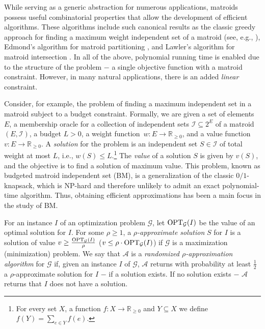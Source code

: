 \documentclass[11pt,letter]{article}
\newcommand{\cA}{{\mathcal{A}}}
\newcommand{\cG}{{\mathcal{G}}}
\newcommand{\OPT}{\textnormal{OPT}}
\def \II   {{\mathcal I}}
\begin{document}
	While serving as a generic abstraction for numerous applications, matroids possess useful combinatorial properties that allow the development of efficient algorithms. 
	These algorithms include such canonical results as the classic greedy approach for finding a maximum weight independent set of a matroid (see, e.g., \cite{CLRS22}), Edmond's algorithm for matroid partitioning \cite{edmonds1965minimum}, and Lawler's algorithm for matroid intersection \cite{La75}. In all of the above, polynomial running time is enabled due to the structure of the problem $-$ a single objective function with a matroid constraint. However, in many natural applications, there is an added {\em linear} constraint. 
	
	Consider, for example, the problem of finding a maximum independent set in a matroid subject to a budget constraint. Formally, we are given 
	a set of elements $E$, a membership oracle for a collection of independent sets $\II \subseteq 2^{E}$ of a matroid $(E, \II)$, %
	a budget $L>0$, a weight function~$w:E\to \mathbb{R}_{\geq 0}$, and a value function $v:E\rightarrow \mathbb{R}_{\geq 0}$. A {\em solution} for the problem is an independent set $S \in \II$ of total weight at most $L$, i.e., $w(S) \leq L$.\footnote{For every set $X$, a function $f:X \rightarrow \mathbb{R}_{\geq 0}$ and $Y \subseteq X$ we define $f(Y) = \sum_{e \in Y} f(e)$.} The {\em value} of a solution $S$ is given by $v(S)$,
	and the objective is to find a solution of maximum value. This problem, known as {\sc budgeted matroid independent set (BM)}, is a generalization of the classic $0/1${\sc-knapsack}, which is NP-hard
	and therefore unlikely to admit an exact polynomial-time algorithm. Thus, obtaining efficient approximations has been a main focus in the study of BM.

	
 For an instance $I$ of an optimization problem $\cG$, let $\OPT_{\cG}(I)$ be the value of an optimal solution for $I$. For some $\rho \geq 1$, a {\em $\rho$-approximate solution} $S$ for $I$ is a solution of value $v \geq \frac{\OPT_{\cG}(I)}{\rho}$ ($v \leq \rho \cdot \OPT_{\cG}(I)$) if $\cG$ is a maximization (minimization) problem. 
 We say that $\cA$ is a {\em randomized $\rho$-approximation algorithm} for $\cG$ if,
given an instance $I$ of $\cG$, $\cA$
returns with probability at least $\frac{1}{2}$ a $\rho$-approximate solution for $I$ $-$ if a solution exists. If no solution exists $-$ $\cA$ returns that $I$ does not have a solution.
	
\end{document}
